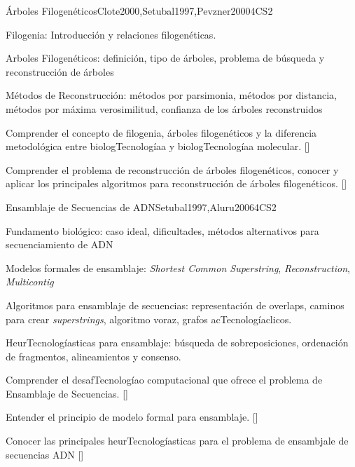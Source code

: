 \begin{syllabus}
\begin{unit}{Árboles Filogenéticos}{}{Clote2000,Setubal1997,Pevzner2000}{4}{CS2}
\begin{topics}
\item Filogenia: Introducción y relaciones filogenéticas.
\item Arboles Filogenéticos: definición, tipo de árboles, problema de búsqueda y reconstrucción de árboles
\item Métodos de Reconstrucción: métodos por parsimonia, métodos por distancia, métodos por máxima verosimilitud, confianza de los árboles reconstruidos
\end{topics}

\begin{learningoutcomes}
\item  Comprender el concepto de filogenia, árboles filogenéticos y la diferencia metodológica entre biologTecnologíaa y biologTecnologíaa molecular. [\Familiarity]
\item Comprender el problema de reconstrucción de árboles filogenéticos, conocer y aplicar los principales algoritmos para reconstrucción de árboles filogenéticos. [\Assessment]
\end{learningoutcomes}
\end{unit}

\begin{unit}{Ensamblaje de Secuencias de ADN}{}{Setubal1997,Aluru2006}{4}{CS2}
\begin{topics}
\item Fundamento biológico: caso ideal, dificultades, métodos alternativos para secuenciamiento de ADN
\item Modelos formales de ensamblaje: \textit{Shortest Common Superstring}, \textit{Reconstruction}, \textit{Multicontig}
\item Algoritmos para ensamblaje de secuencias: representación de overlaps, caminos para crear \textit{superstrings}, algoritmo voraz, grafos acTecnologíaclicos.
\item HeurTecnologíasticas para ensamblaje: búsqueda de sobreposiciones, ordenación de fragmentos, alineamientos y consenso.
\end{topics}

\begin{learningoutcomes}
\item Comprender el desafTecnologíao computacional que ofrece el problema de Ensamblaje de Secuencias. [\Familiarity]
\item Entender el principio de modelo formal para ensamblaje. [\Assessment]
\item Conocer las principales heurTecnologíasticas para el problema de ensambjale de secuencias ADN [\Usage]
\end{learningoutcomes}
\end{unit}


\end{syllabus}
